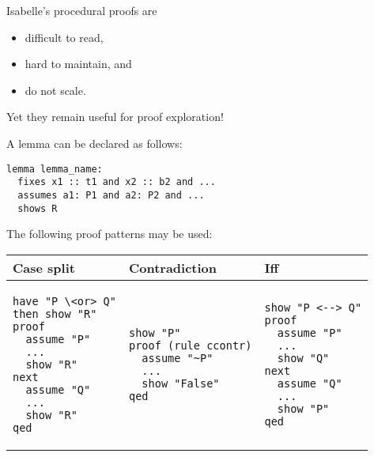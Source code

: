\documentclass{article}
\begin{document}
Isabelle's procedural proofs are
\begin{itemize}
	\item difficult to read,
	\item hard to maintain, and
	\item do not scale.
\end{itemize}
Yet they remain useful for proof exploration!

\begin{definition}[Lemma]
	A lemma can be declared as follows:
	\begin{verbatim}
lemma lemma_name:
  fixes x1 :: t1 and x2 :: b2 and ...
  assumes a1: P1 and a2: P2 and ... 
  shows R
	\end{verbatim}
\end{definition}

\begin{definition}
	The following proof patterns may be used:
	\begin{center}
		\begin{tabular}{l | l | l }
			\textbf{Case split}             &
			\textbf{Contradiction}          &
			\textbf{Iff}                      \\
			\hline
			\begin{minipage}[t]{0.25\textwidth}
				\begin{verbatim}
have "P \<or> Q"
then show "R"
proof
  assume "P"
  ...
  show "R"
next
  assume "Q"
  ... 
  show "R"
qed
				\end{verbatim}
			\end{minipage}      &
			\begin{minipage}[t]{0.25\textwidth}
				\begin{verbatim}
show "P"
proof (rule ccontr)
  assume "~P"
  ...
  show "False"
qed
				\end{verbatim}
			\end{minipage}      &
			\begin{minipage}[t]{0.25\textwidth}
				\begin{verbatim}
show "P <--> Q"
proof
  assume "P"
  ... 
  show "Q"
next
  assume "Q"
  ... 
  show "P"
qed
					\end{verbatim}
			\end{minipage}
		\end{tabular}
	\end{center}
\end{definition}
\end{document}
